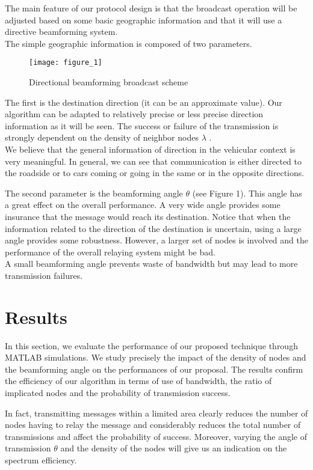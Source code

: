 \documentclass{IEEEtran}
\begin{document}
The main feature of our protocol design is that the broadcast
operation will be adjusted based on some basic geographic
information and that it will use a directive beamforming system.
\\
The simple geographic information is composed of two parameters.

\begin{figure}[!htbp]
  \centering
\texttt{[image: figure\_1]}
 \caption{Directional beamforming broadcast scheme}
 
 
\end{figure}


The first is  the destination direction (it can be an approximate
value). Our algorithm can be adapted to relatively precise or less
precise direction information as it will be seen. The success or
failure of the transmission is strongly
dependent on the density of neighbor nodes $\lambda$ .\\
We believe that the general information of direction in the
vehicular context is very meaningful. In general, we can see that
communication is either directed to the roadside or to cars coming
or going in the same or in the opposite directions.

The second parameter is the beamforming angle $\theta$ (see Figure
1). This angle has a great effect on the overall performance. A very
wide angle provides some insurance that the message would reach its
destination. Notice that when the information related to the
direction of the destination is uncertain, using a large angle
provides some robustness. However, a larger set of nodes is involved
and the performance of the overall relaying system might be bad. \\
A small beamforming angle prevents waste of bandwidth
but may lead to more transmission failures.

\section{Results}

In this section, we evaluate the performance of our proposed
technique through MATLAB simulations. We study precisely the impact
of the density of nodes and the beamforming angle on the
performances of our proposal. The results confirm the efficiency of
our algorithm in terms of use of bandwidth, the ratio of implicated
nodes and the probability of transmission success.

In fact, transmitting messages within a limited area clearly reduces
the number of nodes having to relay the message and considerably
reduces the total number of transmissions and affect the probability
of success. Moreover, varying the angle of transmission $\theta$ and
the density of the nodes will give us an indication on the spectrum
efficiency.
\end{document}
